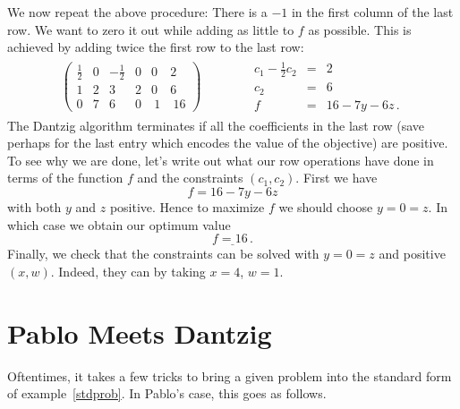 \begin{example}
We now repeat the above procedure: There is a $-1$ in the first column of the last row. We want to zero it out while adding as little to
$f$ as possible. This is achieved by adding twice the first row to the last row:
\[
\begin{array}{c|c}
\left(
\begin{array}{rrrrr|r}
\frac12&0&-\frac12&0&0&2\\[1mm]
1&2&3&2&0&6\\\hline
0&7&6&0&\ 1&\ 16
\end{array}\right)
\quad\quad  &\quad 
\begin{array}{rcl}
c_1-\frac12 c_2&=&2\\[1mm]
c_2&=&6\\
f&=&16-7y-6z\, .
\end{array}
\end{array}
\]
The Dantzig algorithm terminates if all the coefficients in the last row (save perhaps for the last entry which encodes the value of the objective) are positive.
To see why we are done, let's write out what our row operations have done in terms of the function $f$ and the constraints $(c_1,c_2)$.
First we have
\[
f=16-7y-6z
\]
with both $y$ and $z$ positive. Hence to maximize $f$ we should choose $y=0=z$. In which case we obtain our optimum value
\[
\underline{f=16\, .}
\]
Finally, we check that the constraints can be solved with $y=0=z$ and positive $(x,w)$. Indeed, they can by taking $x=4$, $w=1$.
\end{example} 

\section{Pablo Meets Dantzig} 
Oftentimes, it takes a few tricks to bring a given problem into the standard  form of example~\ref{stdprob}. In Pablo's case, this goes as follows.

